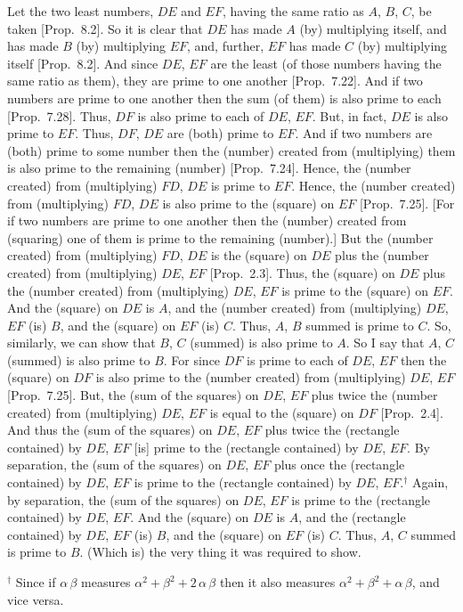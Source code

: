 \begin{Parallel}{}{}
{Let the two least numbers, $DE$ and $EF$, having the same ratio as
$A$, $B$, $C$, be taken [Prop.~8.2]. So
it is clear that $DE$ has made $A$ (by) multiplying itself, and
has made $B$ (by) multiplying $EF$, and, further, $EF$ has made $C$ (by)
multiplying itself [Prop.~8.2]. And since $DE$, $EF$ are the least (of those numbers having the same ratio as them), 
they are prime to one another [Prop.~7.22]. 
And if two numbers are prime to one another then the sum (of them)
is also prime to each [Prop.~7.28]. Thus, $DF$
is also prime to each of $DE$, $EF$. But, in fact, $DE$ is  also prime to $EF$.
Thus, $DF$, $DE$ are (both) prime to $EF$. And if two numbers are (both)
prime to some number then the (number) created from (multiplying) them
is also prime to the remaining (number) [Prop.~7.24].
Hence, the (number created) from (multiplying) $FD$, $DE$ is prime
to $EF$. Hence, the (number created) from (multiplying) $FD$, $DE$ is also prime
to the (square) on $EF$ [Prop.~7.25]. 
[For if two numbers are prime to one another then the (number) created from
(squaring) one of them is prime to the remaining (number).]
But the (number created) from (multiplying) $FD$, $DE$ is the
(square) on $DE$ plus the (number created) from (multiplying) $DE$, $EF$
[Prop.~2.3]. Thus, the (square) on $DE$ plus
the (number created) from (multiplying) $DE$, $EF$ is prime to the
(square) on $EF$. 
And the (square)
on $DE$ is $A$, and the (number created) from (multiplying) $DE$, $EF$
(is) $B$, and the (square) on $EF$ (is) $C$. Thus,  $A$, $B$ summed is prime to $C$. So,  similarly, we can show that $B$, $C$ (summed) is also
prime to $A$. So I say that $A$, $C$ (summed) is also prime to $B$.
For since $DF$ is prime to each of $DE$, $EF$ then the (square) on
$DF$ is also prime to the (number created) from (multiplying) $DE$, $EF$
[Prop.~7.25]. But, the (sum of the squares) on $DE$, $EF$
plus twice the (number created) from (multiplying) $DE$, $EF$ is equal to
the (square) on $DF$ [Prop.~2.4]. And thus
the (sum of the squares) on $DE$, $EF$ plus twice  the (rectangle contained) by $DE$, $EF$ [is] prime to the (rectangle contained) by $DE$, $EF$.
By separation, the (sum of the squares) on $DE$, $EF$ plus  once the (rectangle contained) by $DE$, $EF$  is prime to the (rectangle contained)  by $DE$, $EF$.$^\dag$ Again, by separation,  the (sum of the squares) on $DE$, $EF$ is prime to the (rectangle contained)  by $DE$, $EF$. And the (square) on $DE$   is $A$,  and the (rectangle contained) by $DE$, $EF$ (is) $B$, and the (square) on $EF$ (is) $C$. Thus, $A$, $C$
summed is prime to $B$. (Which is) the very thing it was required to show.}
\end{Parallel}
{\footnotesize\noindent$^\dag$ Since if $\alpha\,\beta$ measures
$\alpha^2+\beta^2+2\,\alpha\,\beta$ then it also measures $\alpha^2+\beta^2+\alpha\,\beta$, and vice versa.}

